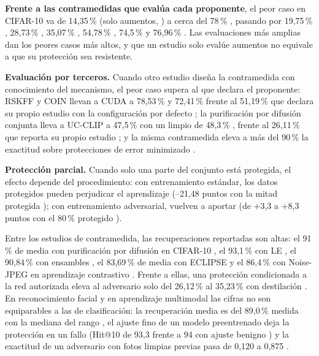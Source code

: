 \documentclass[pdflatex,sn-mathphys-num]{sn-jnl}
\theoremstyle{thmstyleone}
\theoremstyle{thmstyletwo}
\theoremstyle{thmstylethree}
\begin{document}
\textbf{Frente a las contramedidas que evalúa cada proponente}, el peor caso en CIFAR-10 va de 14,35\,\% (solo aumentos, \cite{ma2025t2ue}) a cerca del 78\,\% \cite{sadasivan2023cuda}, pasando por 19,75\,\% \cite{zhang2023cleanlabel}, 28,73\,\% \cite{li2026wavelet}, 35,07\,\% \cite{chen2025eun}, 54,78\,\% \cite{huang2025imperfect}, 74,5\,\% \cite{zhang2026provably} y 76,96\,\% \cite{liu2024game}. Las evaluaciones más amplias dan los peores casos más altos, y que un estudio solo evalúe aumentos no equivale a que su protección sea resistente.

\textbf{Evaluación por terceros.} Cuando otro estudio diseña la contramedida con conocimiento del mecanismo, el peor caso supera al que declara el proponente: RSKFF y COIN llevan a CUDA a 78,53\,\% y 72,41\,\% \cite{li2025kspace,li2025coin} frente al 51,19\,\% que declara su propio estudio con la configuración por defecto \cite{sadasivan2023cuda}; la purificación por difusión conjunta lleva a UC-CLIP a 47,5\,\% con un limpio de 48,3\,\% \cite{jiang2023false}, frente al 26,11\,\% que reporta su propio estudio \cite{zhang2023clusters}; y la misma contramedida eleva a más del 90\,\% la exactitud sobre protecciones de error minimizado \cite{jiang2023false}.

\textbf{Protección parcial.} Cuando solo una parte del conjunto está protegida, el efecto depende del procedimiento: con entrenamiento estándar, los datos protegidos pueden perjudicar el aprendizaje (--21,48 puntos con la mitad protegida \cite{zhang2026provably}); con entrenamiento adversarial, vuelven a aportar (de +3,3 a +8,3 puntos con el 80\,\% protegido \cite{sadasivan2023cuda,huang2025imperfect,li2025kspace}).

Entre los estudios de contramedida, las recuperaciones reportadas son altas: el 91\,\% de media con purificación por difusión en CIFAR-10 \cite{dolatabadi2024devil}, el 93,1\,\% con LE \cite{jiang2023false}, el 90,84\,\% con ensambles \cite{hapuarachchi2025advancing}, el 83,69\,\% de media con ECLIPSE \cite{wang2024eclipse} y el 86,4\,\% con Noise-JPEG en aprendizaje contrastivo \cite{guo2024jpeg}. Frente a ellas, una protección condicionada a la red autorizada eleva al adversario solo del 26,12\,\% al 35,23\,\% con destilación \cite{ye2024ungeneralizable}. En reconocimiento facial y en aprendizaje multimodal las cifras no son equiparables a las de clasificación: la recuperación media es del 89,0\,\% medida con la mediana del rango \cite{li2025crossmodal}, el ajuste fino de un modelo preentrenado deja la protección en un fallo (Hit@10 de 93,3 frente a 94 con ajuste benigno \cite{liu2024multimodal}) y la exactitud de un adversario con fotos limpias previas pasa de 0,120 a 0,875 \cite{chen2021oriole}.
\end{document}
